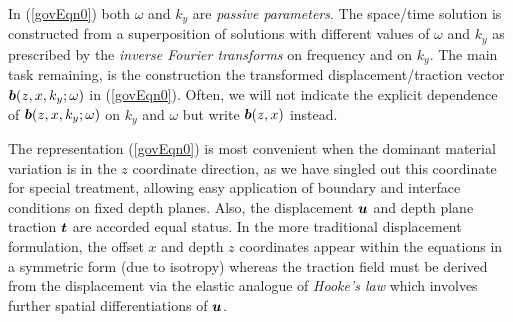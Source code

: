 \documentclass[11pt,a4paper]{article}
\newcommand{\bmi}[1]{\mbox{\boldmath$\mit #1$\unboldmath}}
\begin{document}
In (\ref{govEqn0}) both $\omega$ and ${  k}_{  y}$ are {\em passive
parameters\/}. The space/time solution is constructed from a
superposition of solutions with different values of $\omega$ and ${  k}_{  y}$
as prescribed by the {\em inverse Fourier transforms\/}
on frequency and on $k_y$. The main task remaining, is the construction the
transformed displacement/traction vector ${\bmi  b }(z,x,k_y; \omega)$ in (\ref{govEqn0}).
Often, we will not indicate the explicit dependence of  ${\bmi  b }(z,x,k_y; \omega)$
on $k_y$ and $\omega$ but write ${\bmi  b }(z,x)$ instead.

The representation (\ref{govEqn0}) is most convenient when the
dominant material variation is in the $z$ coordinate direction, as we have
singled out this coordinate for special treatment, allowing easy application of
boundary and interface conditions on fixed depth planes.  Also, the
displacement ${\bmi  u}$ and depth plane traction ${\bmi  t}$ are accorded equal status.
In the more traditional displacement formulation, the  offset $x$ and depth $z$
coordinates appear within the equations in a symmetric form (due to isotropy)
whereas the traction field must be derived from the displacement via the
elastic analogue of {\em Hooke's law\/} which involves further spatial
differentiations of $\bmi  u$.
\end{document}
